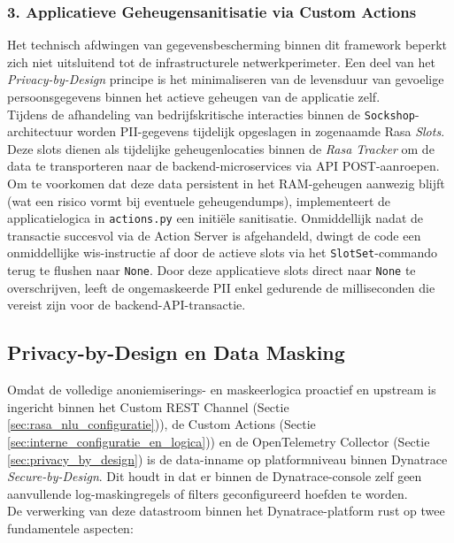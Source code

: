 \subsubsection*{3. Applicatieve Geheugensanitisatie via Custom Actions}
Het technisch afdwingen van gegevensbescherming binnen dit framework beperkt zich niet uitsluitend tot de infrastructurele netwerkperimeter. Een deel van het \textit{Privacy-by-Design} principe is het minimaliseren van de levensduur van gevoelige persoonsgegevens binnen het actieve geheugen van de applicatie zelf.\\

Tijdens de afhandeling van bedrijfskritische interacties binnen de \texttt{Sockshop}-architectuur worden PII-gegevens tijdelijk opgeslagen in zogenaamde Rasa \textit{Slots}. Deze slots dienen als tijdelijke geheugenlocaties binnen de \textit{Rasa Tracker} om de data te transporteren naar de backend-microservices via API POST-aanroepen.\\

Om te voorkomen dat deze data persistent in het RAM-geheugen aanwezig blijft (wat een risico vormt bij eventuele geheugendumps), implementeert de applicatielogica in \texttt{actions.py} een initiële sanitisatie. Onmiddellijk nadat de transactie succesvol via de Action Server is afgehandeld, dwingt de code een onmiddellijke wis-instructie af door de actieve slots via het \texttt{SlotSet}-commando terug te flushen naar \texttt{None}. Door deze applicatieve slots direct naar \texttt{None} te overschrijven, leeft de ongemaskeerde PII enkel gedurende de milliseconden die vereist zijn voor de backend-API-transactie. 

\subsection{Privacy-by-Design en Data Masking}

Omdat de volledige anoniemiserings- en maskeerlogica proactief en upstream is ingericht binnen het Custom REST Channel (Sectie \ref{sec:rasa_nlu_configuratie})), de Custom Actions (Sectie \ref{sec:interne_configuratie_en_logica})) en de OpenTelemetry Collector (Sectie \ref{sec:privacy_by_design}) is de data-inname op platformniveau binnen Dynatrace \textit{Secure-by-Design}. Dit houdt in dat er binnen de Dynatrace-console zelf geen aanvullende log-maskingregels of filters geconfigureerd hoefden te worden.\\

De verwerking van deze datastroom binnen het Dynatrace-platform rust op twee fundamentele aspecten:

